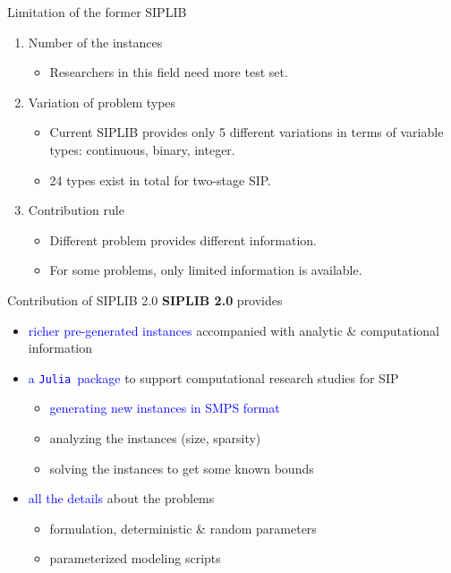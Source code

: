 \documentclass{beamer}
\newcommand{\siplibtwo}{\textsf{SIPLIB 2.0}}
\newcommand{\siplib}{\textsf{SIPLIB}}
\newcommand{\julia}{\texttt{Julia}}
\begin{document}
	\begin{frame}{Limitation of the former \siplib}
		\begin{enumerate}
			\item Number of the instances
			\begin{itemize}
				\item Researchers in this field need more test set.
			\end{itemize}
			\item Variation of problem types
			\begin{itemize}
				\item Current SIPLIB provides only 5 different variations in terms of variable types: continuous, binary, integer.
				\item 24 types exist in total for two-stage SIP.
			\end{itemize}
			\item Contribution rule
			\begin{itemize}
				\item Different problem provides different information.
				\item For some problems, only limited information is available.
			\end{itemize}
		\end{enumerate}
	\end{frame}

	\begin{frame}{Contribution of \siplibtwo}
		\textbf{\siplibtwo} provides
		\begin{itemize}
			\item \textcolor{blue}{richer pre-generated instances} accompanied with analytic \& computational information
			\item \textcolor{blue}{a \julia\ package} to support computational research studies for SIP 
			\begin{itemize}
				\item \textcolor{blue}{generating new instances in SMPS format}
				\item analyzing the instances (size, sparsity)
				\item solving the instances to get some known bounds
			\end{itemize}
			\item \textcolor{blue}{all the details} about the problems
			\begin{itemize}
				\item formulation, deterministic \& random parameters
				\item parameterized modeling scripts
			\end{itemize}
		\end{itemize}
	\end{frame}
	
\end{document}
